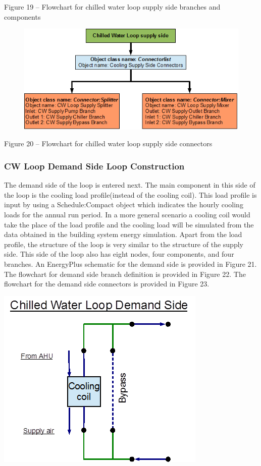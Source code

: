 Figure 19 -- Flowchart for chilled water loop supply side branches and components

\begin{figure}[htbp]
\centering
\includegraphics{media/image020.png}
\caption{}
\end{figure}

Figure 20 -- Flowchart for chilled water loop supply side connectors

\subsubsection{CW Loop Demand Side Loop Construction}\label{cw-loop-demand-side-loop-construction}

The demand side of the loop is entered next. The main component in this side of the loop is the cooling load profile(instead of the cooling coil). This load profile is input by using a Schedule:Compact object which indicates the hourly cooling loads for the annual run period. In a more general scenario a cooling coil would take the place of the load profile and the cooling load will be simulated from the data obtained in the building system energy simulation. Apart from the load profile, the structure of the loop is very similar to the structure of the supply side. This side of the loop also has eight nodes, four components, and four branches. An EnergyPlus schematic for the demand side is provided in Figure 21. The flowchart for demand side branch definition is provided in Figure 22. The flowchart for the demand side connectors is provided in Figure 23.

\textbf{\includegraphics{media/image021.png}}

